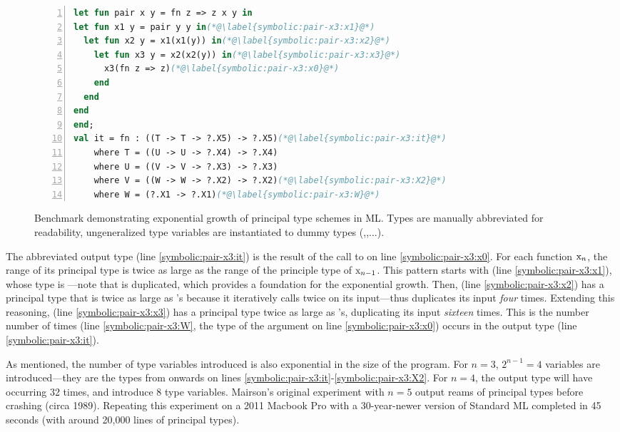 \begin{figure}
\begin{lstlisting}[language=ml, numbers=left]
let fun pair x y = fn z => z x y in
let fun x1 y = pair y y in(*@\label{symbolic:pair-x3:x1}@*)
  let fun x2 y = x1(x1(y)) in(*@\label{symbolic:pair-x3:x2}@*)
    let fun x3 y = x2(x2(y)) in(*@\label{symbolic:pair-x3:x3}@*)
      x3(fn z => z)(*@\label{symbolic:pair-x3:x0}@*)
    end
  end
end
end;
val it = fn : ((T -> T -> ?.X5) -> ?.X5)(*@\label{symbolic:pair-x3:it}@*)
    where T = ((U -> U -> ?.X4) -> ?.X4)
    where U = ((V -> V -> ?.X3) -> ?.X3)
    where V = ((W -> W -> ?.X2) -> ?.X2)(*@\label{symbolic:pair-x3:X2}@*)
    where W = (?.X1 -> ?.X1)(*@\label{symbolic:pair-x3:W}@*)
\end{lstlisting}
\caption{Benchmark demonstrating exponential growth of principal type schemes in ML.
  Types are manually abbreviated for readability, ungeneralized type variables are
  instantiated to dummy types (,,...).}
\label{symbolic:figure:pair-benchmark}
\end{figure}

The abbreviated output type  (line \ref{symbolic:pair-x3:it}) is the result of the call to 
on line \ref{symbolic:pair-x3:x0}.
For each function $\text{\sml{x}}_n$, the range of its principal type is twice as large as
the range of the principle type of $\text{\sml{x}}_{n-1}$.
This pattern starts with  (line \ref{symbolic:pair-x3:x1}),
whose type is ---note that 
is duplicated, which provides a foundation for the exponential growth.
Then,  (line \ref{symbolic:pair-x3:x2})
has a principal type that is twice as large as 's because it
iteratively calls  twice on its input---thus  duplicates its input \emph{four} times.
Extending this reasoning,  (line \ref{symbolic:pair-x3:x3})
has a principal type twice as large as 's,
duplicating its input \emph{sixteen} times.
This is the number number of times  (line \ref{symbolic:pair-x3:W},
the type of the argument  on line \ref{symbolic:pair-x3:x0})
occurs in the output type (line \ref{symbolic:pair-x3:it}).

As mentioned, the number of type variables introduced is also exponential
in the size of the program. For $n=3$, $2^{n-1}=4$ variables are introduced---they are the types from
 onwards on lines \ref{symbolic:pair-x3:it}-\ref{symbolic:pair-x3:X2}.
For $n=4$, the output type will have  occurring 32 times,
and introduce 8 type variables.
Mairson's original experiment with $n=5$ output reams of principal
types before crashing (circa 1989).
Repeating this experiment on a 2011 Macbook Pro with a 30-year-newer version of Standard ML
completed in 45 seconds (with around 20,000 lines of principal types).

